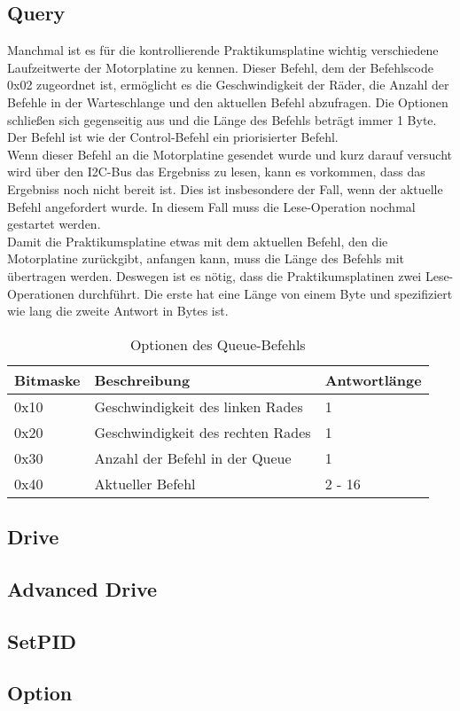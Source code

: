 \subsection{Query}
Manchmal ist es für die kontrollierende Praktikumsplatine wichtig verschiedene Laufzeitwerte
der Motorplatine zu kennen. Dieser Befehl, dem der Befehlscode 0x02 zugeordnet ist, ermöglicht
es die Geschwindigkeit der Räder, die Anzahl der Befehle in der Warteschlange und den aktuellen
Befehl abzufragen. Die Optionen schließen sich gegenseitig aus und die Länge des Befehls beträgt
immer 1 Byte. Der Befehl ist wie der Control-Befehl ein priorisierter Befehl.\\
Wenn dieser Befehl an die Motorplatine gesendet wurde und kurz darauf versucht wird über den
I2C-Bus das Ergebniss zu lesen, kann es vorkommen, dass das Ergebniss noch nicht bereit ist.
Dies ist insbesondere der Fall, wenn der aktuelle Befehl angefordert wurde. In diesem Fall muss
die Lese-Operation nochmal gestartet werden.\\
Damit die Praktikumsplatine etwas mit dem aktuellen Befehl, den die Motorplatine zurückgibt,
anfangen kann, muss die Länge des Befehls mit übertragen werden. Deswegen ist es nötig,
dass die Praktikumsplatinen zwei Lese-Operationen durchführt. Die erste hat eine Länge
von einem Byte und spezifiziert wie lang die zweite Antwort in Bytes ist.

\begin{table}[htb]
\begin{center}
	\begin{tabularx}{\linewidth}{|l|l|X|}
		\hline
		\textbf{Bitmaske} & \textbf{Beschreibung} & \textbf{Antwortlänge} \\
		\hline
		\hline
		0x10 				& Geschwindigkeit des linken Rades & 1 \\
		\hline
		0x20				& Geschwindigkeit des rechten Rades & 1 \\
		\hline
		0x30				& Anzahl der Befehl in der Queue & 1 \\
		\hline
		0x40				& Aktueller Befehl & 2 - 16 \\
		\hline
	\end{tabularx}
	\caption{\label{protocol_queue} Optionen des Queue-Befehls}
\end{center}
\end{table}
\subsection{Drive}
\subsection{Advanced Drive}
\subsection{SetPID}
\subsection{Option}
